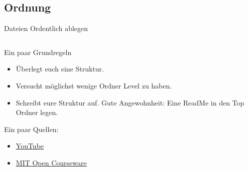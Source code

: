 
\subsection{Ordnung}
\begin{frame}[t]{Dateien Ordentlich ablegen}
    \begin{columns}
        \begin{column}{0.5\textwidth}
            \vspace{-6cm}
            \begin{block}{Ein paar Grundregeln}
                \begin{itemize}
                    \item Überlegt euch eine Struktur.                 
                    \item Versucht möglichst wenige Ordner Level zu haben.
                    \item Schreibt eure Struktur auf. Gute Angewohnheit: Eine ReadMe in den Top Ordner legen.
            \end{itemize}  
            \end{block}
            {\small Ein paar Quellen:
            \begin{itemize}[]
                \item \href{https://www.youtube.com/watch?v=WtKeeDYA_2I&t=317s}{YouTube}
                \item \href{https://ocw.mit.edu/courses/res-str-002-data-management-spring-2016/497580bd31c004cc758a2afb0a115aa4_MITRES_STR_002S16_File.pdf}{MIT Open Courseware}
            \end{itemize}
            }


\end{column}
\end{columns}
\end{frame}
